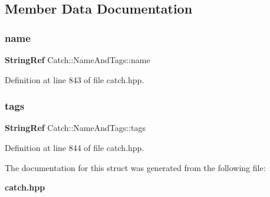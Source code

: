\subsection{Member Data Documentation}
\mbox{\label{struct_catch_1_1_name_and_tags_a7cbea60e0cebfa622c667008eb011420}} 
\subsubsection{name}
{\footnotesize\ttfamily \textbf{ String\+Ref} Catch\+::\+Name\+And\+Tags\+::name}



Definition at line 843 of file catch.\+hpp.

\mbox{\label{struct_catch_1_1_name_and_tags_a74062ed1138834a348424eb7ed900c57}} 
\subsubsection{tags}
{\footnotesize\ttfamily \textbf{ String\+Ref} Catch\+::\+Name\+And\+Tags\+::tags}



Definition at line 844 of file catch.\+hpp.



The documentation for this struct was generated from the following file\+:\begin{DoxyCompactItemize}
\item 
\textbf{ catch.\+hpp}\end{DoxyCompactItemize}

